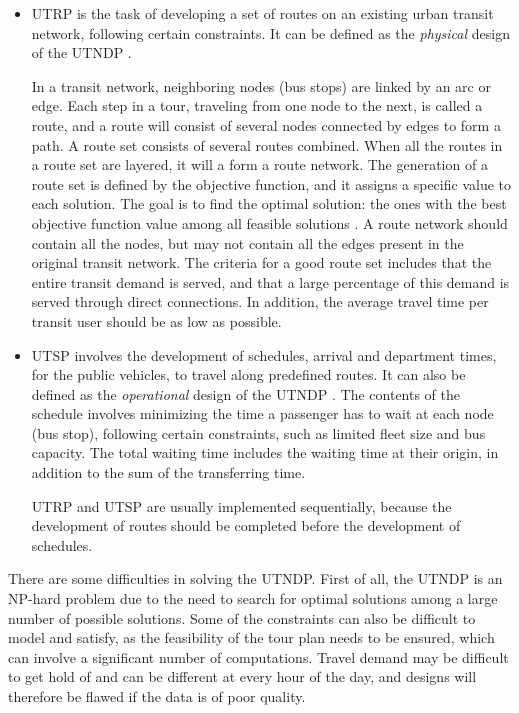\begin{itemize}
\item UTRP is the task of developing a set of routes on an existing urban transit network, following certain constraints. It can be defined as the \textit{physical} design of the UTNDP \citep{fan09}. 

In a transit network, neighboring nodes (bus stops) are linked by an arc or edge. Each step in a tour, traveling from one node to the next, is called a route, and a route will consist of several nodes connected by edges to form a path. A route set consists of several routes combined. When all the routes in a route set are layered, it will a form a route network. The generation of a route set is defined by the objective function, and it assigns a specific value to each solution. The goal is to find the optimal solution: the ones with the best objective function value among all feasible solutions \citep{vehiclerouting}. A route network should contain all the nodes, but may not contain all the edges present in the original transit network. The criteria for a good route set includes that the entire transit demand is served, and that a large percentage of this demand is served through direct connections. In addition, the average travel time per transit user should be as low as possible. 

\item UTSP involves the development of schedules, arrival and department times, for the public vehicles, to travel along predefined routes. It can also be defined as the \textit{operational} design of the UTNDP \citep{fan09}. 
The contents of the schedule involves minimizing the time a passenger has to wait at each node (bus stop), following certain constraints, such as limited fleet size and bus capacity.  The total waiting time includes the waiting time at their origin, in addition to the sum of the transferring time.

UTRP and UTSP are usually implemented sequentially, because the development of routes should be completed before the development of schedules. 
\end{itemize}

There are some difficulties in solving the UTNDP. First of all, the UTNDP is an NP-hard problem due to the need to search for optimal solutions among a large number of possible solutions. Some of the constraints can also be difficult to model and satisfy, as the feasibility of the tour plan needs to be ensured, which can involve a significant number of computations. Travel demand may be difficult to get hold of and can be different at every hour of the day, and designs will therefore be flawed if the data is of poor quality.  

